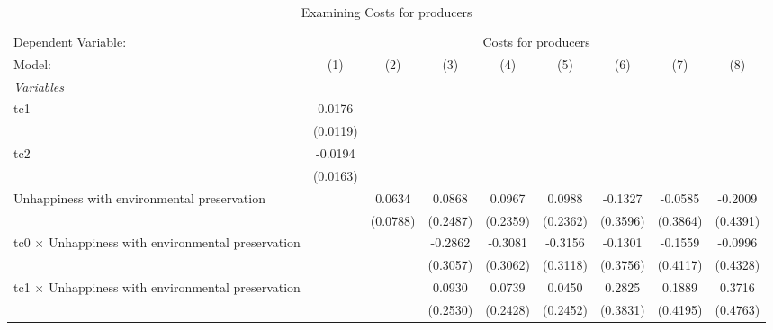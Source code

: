 
\begin{table}[htbp]
   \caption{Examining Costs for producers}
   \centering
   \begin{tabular}{lcccccccc}
      \tabularnewline \midrule \midrule
      Dependent Variable: & \multicolumn{8}{c}{Costs for producers}\\
      Model:                                                    & (1)      & (2)      & (3)      & (4)      & (5)      & (6)      & (7)            & (8)\\  
      \midrule
      \emph{Variables}\\
      tc1                                                       & 0.0176   &          &          &          &          &          &                &   \\   
                                                                & (0.0119) &          &          &          &          &          &                &   \\   
      tc2                                                       & -0.0194  &          &          &          &          &          &                &   \\   
                                                                & (0.0163) &          &          &          &          &          &                &   \\   
      Unhappiness with environmental preservation               &          & 0.0634   & 0.0868   & 0.0967   & 0.0988   & -0.1327  & -0.0585        & -0.2009\\   
                                                                &          & (0.0788) & (0.2487) & (0.2359) & (0.2362) & (0.3596) & (0.3864)       & (0.4391)\\   
      tc0 $\times$ Unhappiness with environmental preservation  &          &          & -0.2862  & -0.3081  & -0.3156  & -0.1301  & -0.1559        & -0.0996\\   
                                                                &          &          & (0.3057) & (0.3062) & (0.3118) & (0.3756) & (0.4117)       & (0.4328)\\   
      tc1 $\times$ Unhappiness with environmental preservation  &          &          & 0.0930   & 0.0739   & 0.0450   & 0.2825   & 0.1889         & 0.3716\\   
                                                                &          &          & (0.2530) & (0.2428) & (0.2452) & (0.3831) & (0.4195)       & (0.4763)\\   

\end{tabular}
\end{table}
